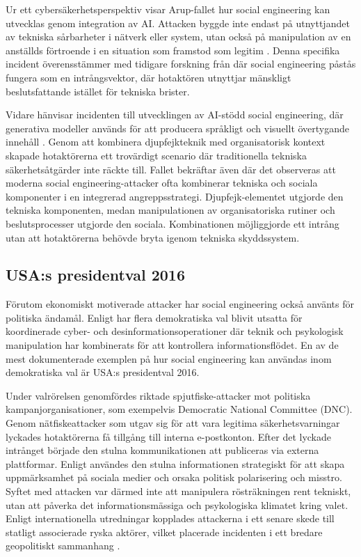 Ur ett cybersäkerhetsperspektiv visar Arup-fallet hur social engineering kan utvecklas genom integration av AI. Attacken byggde inte endast på utnyttjandet av tekniska sårbarheter i nätverk eller system, 
utan också på manipulation av en anställds förtroende i en situation som framstod som legitim \cite{algarni2019se_survey}. Denna specifika incident överensstämmer med tidigare forskning från \cite{algarni2019se_survey} 
där social engineering påstås fungera som en intrångsvektor, där hotaktören utnyttjar mänskligt beslutsfattande istället för tekniska brister.  

Vidare hänvisar incidenten till utvecklingen av AI-stödd social engineering, där generativa modeller används för att producera språkligt och visuellt övertygande innehåll \cite{zhang2024digital_deception}. 
Genom att kombinera djupfejkteknik med organisatorisk kontext skapade hotaktörerna ett trovärdigt scenario där traditionella tekniska säkerhetsåtgärder inte räckte till. Fallet bekräftar även \cite{algarni2024comprehensive_taxonomy} 
där det observeras att moderna social engineering-attacker ofta kombinerar tekniska och sociala komponenter i en integrerad angreppsstrategi. Djupfejk-elementet utgjorde den tekniska komponenten, medan manipulationen av 
organisatoriska rutiner och beslutsprocesser utgjorde den sociala. Kombinationen möjliggjorde ett intrång utan att hotaktörerna behövde bryta igenom tekniska skyddssystem.  

\subsection{USA:s presidentval 2016}
Förutom ekonomiskt motiverade attacker har social engineering också använts för politiska ändamål. Enligt \cite{fiia2016election_hacking} har flera demokratiska val blivit utsatta för koordinerade cyber- och desinformationsoperationer 
där teknik och psykologisk manipulation har kombinerats för att kontrollera informationsflödet. En av de mest dokumenterade exemplen på hur social engineering kan användas inom demokratiska val är USA:s presidentval 2016.

Under valrörelsen genomfördes riktade spjutfiske-attacker mot politiska kampanjorganisationer, som exempelvis Democratic National Committee (DNC). Genom nätfiskeattacker som utgav sig för att vara legitima säkerhetsvarningar 
lyckades hotaktörerna få tillgång till interna e-postkonton. Efter det lyckade intrånget började den stulna kommunikationen att publiceras via externa plattformar. Enligt \cite{fiia2016election_hacking} användes den stulna informationen 
strategiskt för att skapa uppmärksamhet på sociala medier och orsaka politisk polarisering och misstro. Syftet med attacken var därmed inte att manipulera rösträkningen rent tekniskt, utan att påverka det informationsmässiga och psykologiska 
klimatet kring valet. Enligt internationella utredningar kopplades attackerna i ett senare skede till statligt associerade ryska aktörer, vilket placerade incidenten i ett bredare geopolitiskt sammanhang \cite{fiia2016election_hacking}.


